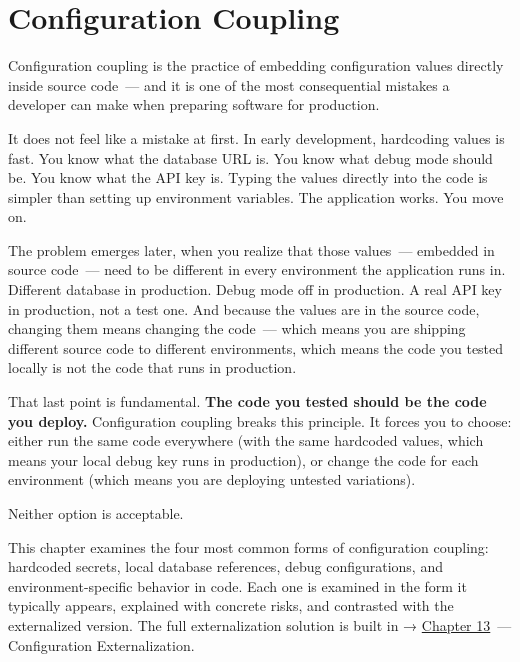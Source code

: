 \setcounter{chapter}{8}
\chapter{Configuration Coupling}\label{ch:09-configuration-coupling}

\chapterrule

Configuration coupling is the practice of embedding configuration values directly inside source code~--- and it is one of the most consequential mistakes a developer can make when preparing software for production.

It does not feel like a mistake at first. In early development, hardcoding values is fast. You know what the database URL is. You know what debug mode should be. You know what the API key is. Typing the values directly into the code is simpler than setting up environment variables. The application works. You move on.

The problem emerges later, when you realize that those values~--- embedded in source code~--- need to be different in every environment the application runs in. Different database in production. Debug mode off in production. A real API key in production, not a test one. And because the values are in the source code, changing them means changing the code~--- which means you are shipping different source code to different environments, which means the code you tested locally is not the code that runs in production.

That last point is fundamental. \textbf{The code you tested should be the code you deploy.} Configuration coupling breaks this principle. It forces you to choose: either run the same code everywhere (with the same hardcoded values, which means your local debug key runs in production), or change the code for each environment (which means you are deploying untested variations).

Neither option is acceptable.

This chapter examines the four most common forms of configuration coupling: hardcoded secrets, local database references, debug configurations, and environment-specific behavior in code. Each one is examined in the form it typically appears, explained with concrete risks, and contrasted with the externalized version. The full externalization solution is built in → \hyperref[ch:13-configuration-externalization]{Chapter 13}~--- Configuration Externalization.

